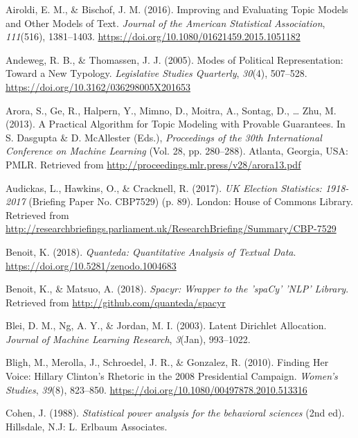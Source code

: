 \documentclass[]{article}
\theoremstyle{definition}
\theoremstyle{definition}
\theoremstyle{definition}
\theoremstyle{remark}
\begin{document}
\hypertarget{refs}{}
\leavevmode\hypertarget{ref-airoldi2016}{}%
Airoldi, E. M., \& Bischof, J. M. (2016). Improving and Evaluating Topic
Models and Other Models of Text. \emph{Journal of the American
Statistical Association}, \emph{111}(516), 1381--1403.
\url{https://doi.org/10.1080/01621459.2015.1051182}

\leavevmode\hypertarget{ref-andeweg2005}{}%
Andeweg, R. B., \& Thomassen, J. J. (2005). Modes of Political
Representation: Toward a New Typology. \emph{Legislative Studies
Quarterly}, \emph{30}(4), 507--528.
\url{https://doi.org/10.3162/036298005X201653}

\leavevmode\hypertarget{ref-arora2013}{}%
Arora, S., Ge, R., Halpern, Y., Mimno, D., Moitra, A., Sontag, D.,
\ldots{} Zhu, M. (2013). A Practical Algorithm for Topic Modeling with
Provable Guarantees. In S. Dasgupta \& D. McAllester (Eds.),
\emph{Proceedings of the 30th International Conference on Machine
Learning} (Vol. 28, pp. 280--288). Atlanta, Georgia, USA: PMLR.
Retrieved from \url{http://proceedings.mlr.press/v28/arora13.pdf}

\leavevmode\hypertarget{ref-audickas2017}{}%
Audickas, L., Hawkins, O., \& Cracknell, R. (2017). \emph{UK Election
Statistics: 1918-2017} (Briefing Paper No. CBP7529) (p. 89). London:
House of Commons Library. Retrieved from
\url{http://researchbriefings.parliament.uk/ResearchBriefing/Summary/CBP-7529}

\leavevmode\hypertarget{ref-benoit2018}{}%
Benoit, K. (2018). \emph{Quanteda: Quantitative Analysis of Textual
Data}. \url{https://doi.org/10.5281/zenodo.1004683}

\leavevmode\hypertarget{ref-benoit2018a}{}%
Benoit, K., \& Matsuo, A. (2018). \emph{Spacyr: Wrapper to the 'spaCy'
'NLP' Library}. Retrieved from \url{http://github.com/quanteda/spacyr}

\leavevmode\hypertarget{ref-blei2003}{}%
Blei, D. M., Ng, A. Y., \& Jordan, M. I. (2003). Latent Dirichlet
Allocation. \emph{Journal of Machine Learning Research}, \emph{3}(Jan),
993--1022.

\leavevmode\hypertarget{ref-bligh2010}{}%
Bligh, M., Merolla, J., Schroedel, J. R., \& Gonzalez, R. (2010).
Finding Her Voice: Hillary Clinton's Rhetoric in the 2008 Presidential
Campaign. \emph{Women's Studies}, \emph{39}(8), 823--850.
\url{https://doi.org/10.1080/00497878.2010.513316}

\leavevmode\hypertarget{ref-cohen1988}{}%
Cohen, J. (1988). \emph{Statistical power analysis for the behavioral
sciences} (2nd ed). Hillsdale, N.J: L. Erlbaum Associates.
\end{document}
